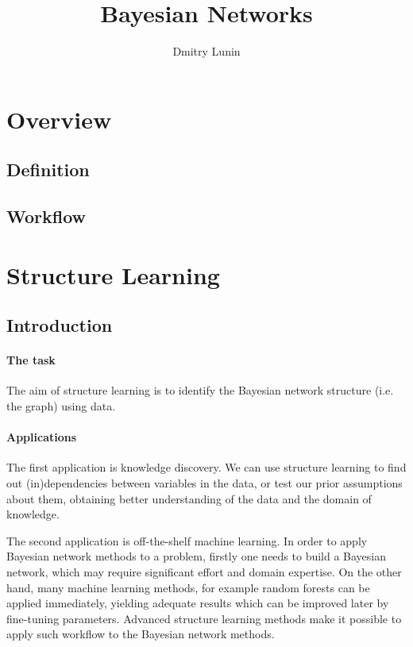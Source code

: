 \documentclass{article}
\author{Dmitry Lunin}
\title{Bayesian Networks}
\begin{document}
\maketitle

\section{Overview}
\subsection{Definition}

\subsection{Workflow}

\section{Structure Learning}
\subsection{Introduction}
\paragraph{The task} The aim of structure learning is to identify the Bayesian network structure (i.e. the graph) using data. 

\paragraph{Applications}

The first application is knowledge discovery. We can use structure learning to find out (in)dependencies between variables in the data, or test our prior assumptions about them, obtaining better understanding of the data and the domain of knowledge. 

The second application is off-the-shelf machine learning. In order to apply Bayesian network methods to a problem, firstly one needs to build a Bayesian network, which may require significant effort and domain expertise. On the other hand, many machine learning methods, for example random forests can be applied immediately, yielding adequate results which can be improved later by fine-tuning parameters. Advanced structure learning methods make it possible to apply such workflow to the Bayesian network methods.
\end{document}
